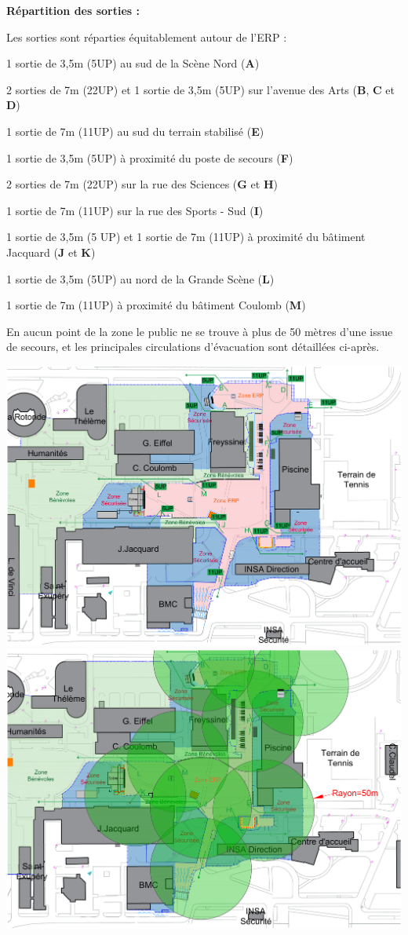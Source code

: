 \documentclass[hidelinks, paper=a4, fontsize=13pt]{report}
\begin{document}
\textbf{Répartition des sorties :}

Les sorties sont réparties équitablement autour de l’ERP :
\begin{list}{•}{}
	\item1 sortie de 3,5m (5UP) au sud de la Scène Nord (\textbf{A}) 
	\item2 sorties de 7m (22UP) et 1 sortie de 3,5m (5UP) sur l’avenue des Arts (\textbf{B}, \textbf{C} et \textbf{D})
	\item1 sortie de 7m (11UP) au sud du terrain stabilisé (\textbf{E})
	\item1 sortie de 3,5m (5UP) à proximité du poste de secours (\textbf{F})
	\item2 sorties de 7m (22UP) sur la rue des Sciences (\textbf{G} et \textbf{H})
	\item1 sortie de 7m (11UP) sur la rue des Sports - Sud (\textbf{I})
	\item1 sortie de 3,5m (5 UP) et 1 sortie de 7m (11UP) à proximité du bâtiment Jacquard (\textbf{J} et \textbf{K})
	\item1 sortie de 3,5m (5UP) au nord de la Grande Scène (\textbf{L})
	\item1 sortie de 7m (11UP) à proximité du bâtiment Coulomb (\textbf{M})
\end{list}

En aucun point de la zone le public ne se trouve à plus de 50 mètres d’une issue de secours, et les principales circulations d’évacuation sont détaillées ci-après. 

\begin{center}
	\includegraphics[width=1\textwidth,keepaspectratio, angle=90]{Exports/Plan_24h_44eme-IS}
	\includegraphics[width=.8\textwidth,keepaspectratio, angle=90]{Exports/Plan_24h_44eme-Cercles}
\end{center}
\end{document}
